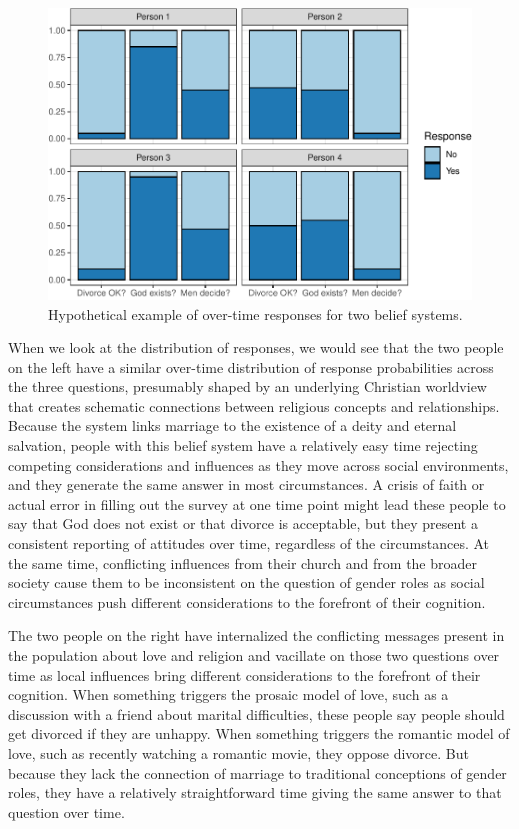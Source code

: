 \documentclass[12pt,]{article}
\begin{document}
\begin{figure}

{\centering \includegraphics{rethinking_constraint_revision_files/figure-latex/sysexample-1} 

}

\caption{Hypothetical example of over-time responses for two belief systems.}\label{fig:sysexample}
\end{figure}

When we look at the distribution of responses, we would see that the two people on the left have a similar over-time distribution of response probabilities across the three questions, presumably shaped by an underlying Christian worldview that creates schematic connections between religious concepts and relationships. Because the system links marriage to the existence of a deity and eternal salvation, people with this belief system have a relatively easy time rejecting competing considerations and influences as they move across social environments, and they generate the same answer in most circumstances. A crisis of faith or actual error in filling out the survey at one time point might lead these people to say that God does not exist or that divorce is acceptable, but they present a consistent reporting of attitudes over time, regardless of the circumstances. At the same time, conflicting influences from their church and from the broader society cause them to be inconsistent on the question of gender roles as social circumstances push different considerations to the forefront of their cognition.

The two people on the right have internalized the conflicting messages present in the population about love and religion and vacillate on those two questions over time as local influences bring different considerations to the forefront of their cognition. When something triggers the prosaic model of love, such as a discussion with a friend about marital difficulties, these people say people should get divorced if they are unhappy. When something triggers the romantic model of love, such as recently watching a romantic movie, they oppose divorce. But because they lack the connection of marriage to traditional conceptions of gender roles, they have a relatively straightforward time giving the same answer to that question over time.
\end{document}
